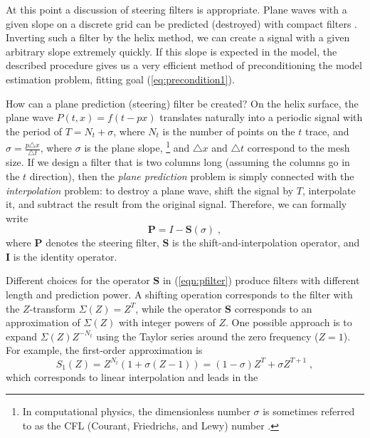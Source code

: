 
At this point a discussion of steering filters is appropriate.
Plane waves with a given slope on a discrete grid can be predicted
(destroyed) with compact filters \cite[]{Schwab.sep.94.matt2}. Inverting
such a filter by the helix method, we can create a signal with a given
arbitrary slope extremely quickly. If this slope is expected in the
model, the described procedure gives us a very efficient method of
preconditioning the model estimation problem, fitting goal (\ref{eq:precondition1}).
\par
How can a plane prediction (steering) filter be created? On the helix surface,
the plane wave $P(t,x) = f (t - p x)$ translates naturally into a
periodic signal with the period of $T = N_t + \sigma$, where $N_t$ is
the number of points on the $t$ trace, and $\sigma = \frac{p \triangle
  x}{\triangle t}$, where $\sigma$ is the plane slope, 
\footnote{In
  computational physics, the dimensionless number $\sigma$ is
  sometimes referred to as the CFL (Courant, Friedrichs, and Lewy)
  number \cite[]{sod}.} 
and $\triangle
x$ and $\triangle t$ correspond to the mesh size.
If we design a filter that is two columns long
(assuming the columns go in the $t$ direction), then the \emph{plane
  prediction} problem is simply connected with the
\emph{interpolation} problem: to destroy a plane wave, shift the
signal by $T$, interpolate it, and subtract the result from the
original signal. Therefore, we can formally write
\begin{equation}
  \label{eqn:pfilter}
  \mathbf{P} = I - \mathbf{S}(\sigma)\;,
\end{equation}
where $\mathbf{P}$ denotes the steering filter, $\mathbf{S}$ is
the shift-and-interpolation operator, and $\mathbf{I}$ is the identity
operator.
\par
Different choices for the operator $\mathbf{S}$ in (\ref{eqn:pfilter})
produce filters with different length and prediction power.
A shifting operation corresponds to the filter with the $Z$-transform
$\Sigma(Z) = Z^T$, while the operator $\mathbf{S}$ corresponds to an
approximation of $\Sigma(Z)$ with integer powers of $Z$. One possible
approach is to expand $\Sigma(Z) Z^{-N_t}$ using the Taylor series around
the zero frequency ($Z=1$). For example, the first-order approximation
is
\begin{equation}
  \label{eqn:plinear}
  S_1(Z) = Z^{N_t} \left(1 + \sigma (Z-1)\right) = (1-\sigma) Z^T +
  \sigma Z^{T+1}\;,
\end{equation}
which corresponds to linear interpolation and leads in the
